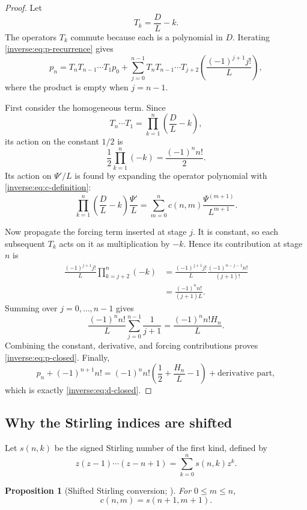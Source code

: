 \documentclass[11pt,oneside]{article}
\newtheorem{proposition}[theorem]{Proposition}
\theoremstyle{definition}
\theoremstyle{remark}
\begin{document}
\begin{proof}
Let
\[
 T_k=\frac DL-k.
\]
The operators $T_k$ commute because each is a polynomial in $D$.  Iterating
\eqref{inverse:eq:p-recurrence} gives
\begin{equation}
 p_n=T_nT_{n-1}\cdots T_1p_0
 +\sum_{j=0}^{n-1}
   T_nT_{n-1}\cdots T_{j+2}
   \left(\frac{(-1)^{j+1}j!}{L}\right),
 \label{inverse:eq:p-iteration}
\end{equation}
where the product is empty when $j=n-1$.

First consider the homogeneous term.  Since
\[
 T_n\cdots T_1
 =\prod_{k=1}^n\left(\frac DL-k\right),
\]
its action on the constant $1/2$ is
\[
 \frac12\prod_{k=1}^n(-k)=\frac{(-1)^nn!}{2}.
\]
Its action on $\Psi'/L$ is found by expanding the operator polynomial with
\eqref{inverse:eq:c-definition}:
\[
 \prod_{k=1}^n\left(\frac DL-k\right)\frac{\Psi'}L
 =\sum_{m=0}^n
   c(n,m)\frac{\Psi^{(m+1)}}{L^{m+1}}.
\]

Now propagate the forcing term inserted at stage $j$.  It is constant, so
each subsequent $T_k$ acts on it as multiplication by $-k$.  Hence its
contribution at stage $n$ is
\begin{align*}
 \frac{(-1)^{j+1}j!}{L}
 \prod_{k=j+2}^n(-k)
 &=
 \frac{(-1)^{j+1}j!}{L}
 \frac{(-1)^{n-j-1}n!}{(j+1)!}\\
 &=\frac{(-1)^nn!}{(j+1)L}.
\end{align*}
Summing over $j=0,\dots,n-1$ gives
\[
 \frac{(-1)^nn!}{L}\sum_{j=0}^{n-1}\frac1{j+1}
 =\frac{(-1)^nn!H_n}{L}.
\]
Combining the constant, derivative, and forcing contributions proves
\eqref{inverse:eq:p-closed}.  Finally,
\[
 p_n+(-1)^{n+1}n!
 =(-1)^nn!\left(\frac12+\frac{H_n}{L}-1\right)
   +\text{derivative part},
\]
which is exactly \eqref{inverse:eq:d-closed}.
\end{proof}

\subsection{Why the Stirling indices are shifted}

Let $s(n,k)$ be the signed Stirling number of the first kind, defined by
\[
 z(z-1)\cdots(z-n+1)=\sum_{k=0}^n s(n,k)z^k.
\]

\begin{proposition}[Shifted Stirling conversion; \Formalized]
\label{inverse:prop:stirling-shift}
For $0\leq m\leq n$,
\[
 c(n,m)=s(n+1,m+1).
\]
\end{proposition}
\end{document}
